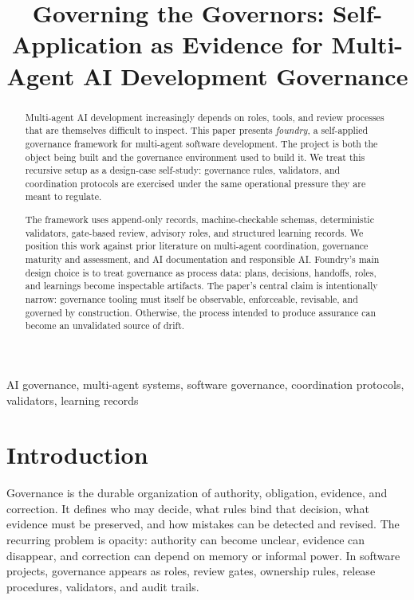 \documentclass[conference]{IEEEtran}
\title{Governing the Governors: Self-Application as Evidence for Multi-Agent AI Development Governance}
\author{\IEEEauthorblockN{Project codename: foundry}
\IEEEauthorblockA{\textit{Self-applied governance framework working paper}\\
\textit{WIP internal draft; low-priority background artifact}\\
2026-06-15}}
\begin{document}
\maketitle

\begin{abstract}
Multi-agent AI development increasingly depends on roles, tools, and review processes that are themselves difficult to inspect. This paper presents \emph{foundry}, a self-applied governance framework for multi-agent software development. The project is both the object being built and the governance environment used to build it. We treat this recursive setup as a design-case self-study: governance rules, validators, and coordination protocols are exercised under the same operational pressure they are meant to regulate.

The framework uses append-only records, machine-checkable schemas, deterministic validators, gate-based review, advisory roles, and structured learning records. We position this work against prior literature on multi-agent coordination, governance maturity and assessment, and AI documentation and responsible AI. Foundry's main design choice is to treat governance as process data: plans, decisions, handoffs, roles, and learnings become inspectable artifacts. The paper's central claim is intentionally narrow: governance tooling must itself be observable, enforceable, revisable, and governed by construction. Otherwise, the process intended to produce assurance can become an unvalidated source of drift.
\end{abstract}

\begin{IEEEkeywords}
AI governance, multi-agent systems, software governance, coordination protocols, validators, learning records
\end{IEEEkeywords}

\section{Introduction}

Governance is the durable organization of authority, obligation, evidence, and correction. It defines who may decide, what rules bind that decision, what evidence must be preserved, and how mistakes can be detected and revised. The recurring problem is opacity: authority can become unclear, evidence can disappear, and correction can depend on memory or informal power. In software projects, governance appears as roles, review gates, ownership rules, release procedures, validators, and audit trails.
\end{document}
